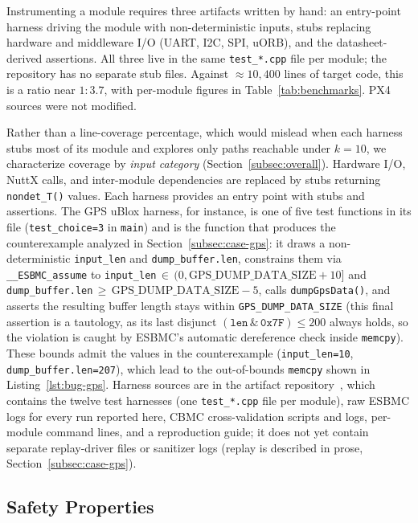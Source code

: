 \documentclass[conference]{IEEEtran}
\newcommand{\entra}[1]{#1}
\newcommand{\corr}[1]{#1}
\begin{document}
\entra{Instrumenting a module requires three artifacts written by hand:
an entry-point harness driving the module with non-deterministic inputs,
stubs replacing hardware and middleware I/O (UART, I2C, SPI, uORB), and
the datasheet-derived assertions.} \entra{All three live in the same
\texttt{test\_*.cpp} file per module; the repository has no separate
stub files.} \entra{Against ${\approx}10{,}400$ lines of
target code, this is a ratio near $1{:}3.7$, with per-module figures in
Table~\ref{tab:benchmarks}. PX4 sources were not modified.}

Rather than a line-coverage percentage, which would mislead when each
harness stubs most of its module and explores only paths reachable
under $k=10$, we characterize coverage by \emph{input category}
(Section~\ref{subsec:overall}). Hardware I/O, NuttX calls, and inter-module dependencies are
replaced by stubs returning \texttt{nondet\_T()} values.
Each harness provides an entry point with stubs and assertions.
\entra{The GPS uBlox harness, for instance, is one of five test functions
in its file (\texttt{test\_choice=3} in \texttt{main}) and is the function
that produces the counterexample analyzed in
Section~\ref{subsec:case-gps}: it draws a non-deterministic
\texttt{input\_len} and \texttt{dump\_buffer.len}, constrains them via
\texttt{\_\_ESBMC\_assume} to
\texttt{input\_len}$\,\in\,(0,\text{GPS\_DUMP\_DATA\_SIZE}{+}10]$ and
\texttt{dump\_buffer.len}$\,\geq\,\text{GPS\_DUMP\_DATA\_SIZE}{-}5$, calls
\texttt{dumpGpsData()}, and asserts the resulting buffer length stays
within \texttt{GPS\_DUMP\_DATA\_SIZE} \corr{(this final assertion is a tautology, as its last disjunct $(\texttt{len}\,\&\,\texttt{0x7F})\le 200$ always holds, so the violation is caught by ESBMC's automatic dereference check inside \texttt{memcpy})}. These bounds admit the
values in the counterexample (\texttt{input\_len=10}, \texttt{dump\_buffer.len=207}),
which lead to the out-of-bounds \texttt{memcpy} shown in
Listing~\ref{lst:bug-gps}.}
Harness sources are in the artifact repository~\cite{Artifact2026}\entra{, which contains the twelve test
harnesses (one \texttt{test\_*.cpp} file per module), raw ESBMC logs for every run reported here, CBMC
cross-validation scripts and logs, per-module command lines, and a
reproduction guide; it does not yet contain separate replay-driver
files or sanitizer logs (replay is described in prose,
Section~\ref{subsec:case-gps}).}

\subsection{Safety Properties}
\label{subsec:properties}
\end{document}
